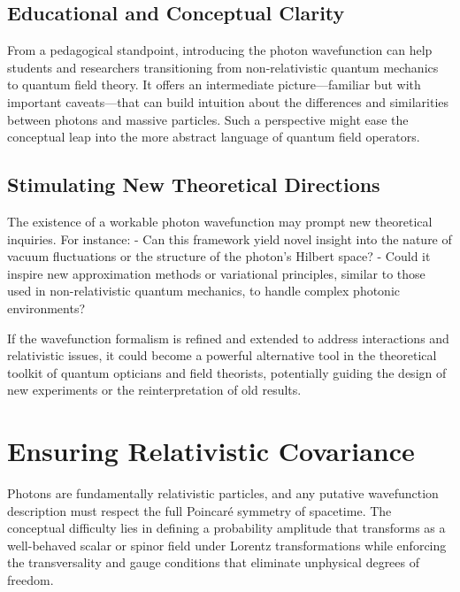 \documentclass[aps,prl,twocolumn,showpacs,showkeys,superscriptaddress,amsmath,amssymb]{revtex4-2}
\begin{document}
\subsection{Educational and Conceptual Clarity}

From a pedagogical standpoint, introducing the photon wavefunction can help students and researchers transitioning from non-relativistic quantum mechanics to quantum field theory. It offers an intermediate picture—familiar but with important caveats—that can build intuition about the differences and similarities between photons and massive particles. Such a perspective might ease the conceptual leap into the more abstract language of quantum field operators.

\subsection{Stimulating New Theoretical Directions}

The existence of a workable photon wavefunction may prompt new theoretical inquiries. For instance:
- Can this framework yield novel insight into the nature of vacuum fluctuations or the structure of the photon’s Hilbert space?
- Could it inspire new approximation methods or variational principles, similar to those used in non-relativistic quantum mechanics, to handle complex photonic environments?

If the wavefunction formalism is refined and extended to address interactions and relativistic issues, it could become a powerful alternative tool in the theoretical toolkit of quantum opticians and field theorists, potentially guiding the design of new experiments or the reinterpretation of old results.


\section{Ensuring Relativistic Covariance}
\label{sec:relativistic_covariance}

Photons are fundamentally relativistic particles, and any putative wavefunction description must respect the full Poincaré symmetry of spacetime. The conceptual difficulty lies in defining a probability amplitude that transforms as a well-behaved scalar or spinor field under Lorentz transformations while enforcing the transversality and gauge conditions that eliminate unphysical degrees of freedom.
\end{document}
